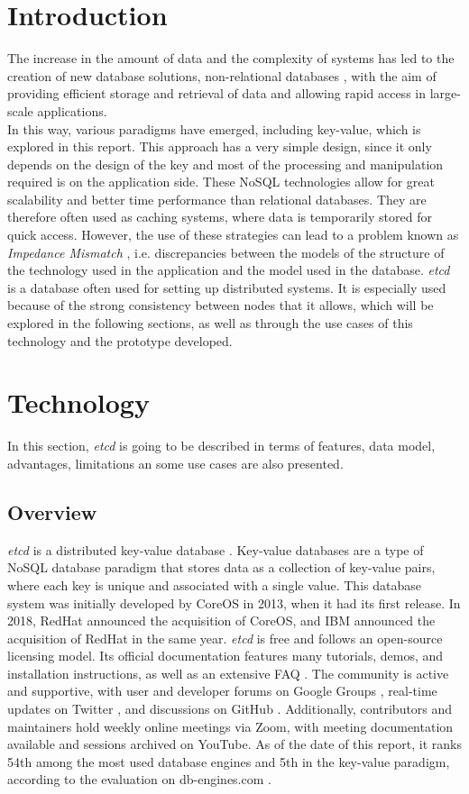 \documentclass[screen,review]{acmart}
\begin{document}
\section{Introduction}
The increase in the amount of data and the complexity of systems has led to the creation of new database solutions, non-relational databases \cite{nosql}, with the aim of providing efficient storage and retrieval of data and allowing rapid access in large-scale applications. \\
In this way, various paradigms have emerged, including key-value, which is explored in this report.
This approach has a very simple design, since it only depends on the design of the key and most of the processing and manipulation required is on the application side. These NoSQL technologies allow for great scalability and better time performance than relational databases. They are therefore often used as caching systems, where data is temporarily stored for quick access. However, the use of these strategies can lead to a problem known as \textit{Impedance Mismatch} \cite{impedance}, i.e. discrepancies between the models of the structure of the technology used in the application and the model used in the database.
\textit{etcd}  is a database often used for setting up distributed systems. It is especially used because of the strong consistency between nodes that it allows, which will be explored in the following sections, as well as through the use cases of this technology and the prototype developed.
    
    
\section{Technology}
In this section, \textit{etcd} is going to be described in terms of features, data model, advantages, limitations an some use cases are also presented.

\subsection{Overview}
\textit{etcd} is a distributed key-value database \cite{key}. Key-value databases are a type of NoSQL database paradigm that stores data as a collection of key-value pairs, where each key is unique and associated with a single value.
This database system was initially developed by CoreOS \cite{core} in 2013, when it had its first release. In 2018, RedHat \cite{red} announced the acquisition of CoreOS, and IBM \cite{ibm} announced the acquisition of RedHat in the same year.
\textit{etcd} is free and follows an open-source licensing model. Its official documentation \cite{documentation} features many tutorials, demos, and installation instructions, as well as an extensive FAQ \cite{etcd_faq}. The community \cite{com} is active and supportive, with user and developer forums on Google Groups \cite{google}, real-time updates on Twitter \cite{twitter}, and discussions on GitHub \cite{github}. Additionally, contributors and maintainers hold weekly online meetings via Zoom, with meeting documentation available and sessions archived on YouTube. As of the date of this report, it ranks 54th among the most used database engines and 5th in the key-value paradigm, according to the evaluation on db-engines.com \cite{db-engines}.
\end{document}
